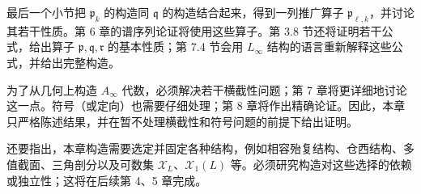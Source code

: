 最后一个小节把 $\mathfrak p_k$ 的构造同 $\mathfrak q$ 的构造结合起来，得到一列推广算子
$\mathfrak p_{\ell,k}$，并讨论其若干性质。第 6 章的谱序列论证将使用这些算子。第 3.8 节还将证明若干公式，给出算子
$\mathfrak p,\mathfrak q,\mathfrak r$ 的基本性质；第 7.4 节会用
$L_\infty$ 结构的语言重新解释这些公式，并给出完整构造。

为了从几何上构造 $A_\infty$ 代数，必须解决若干横截性问题；第 7 章将更详细地讨论这一点。符号（或定向）也需要仔细处理；第 8 章将作出精确论证。因此，本章只严格陈述结果，并在暂不处理横截性和符号问题的前提下给出证明。

还要指出，本章构造需要选定并固定各种结构，例如相容殆复结构、仓西结构、多值截面、三角剖分以及可数集
$\mathcal X_L$、$\mathcal X_1(L)$ 等。必须研究构造对这些选择的依赖或独立性；这将在后续第 4、5 章完成。
